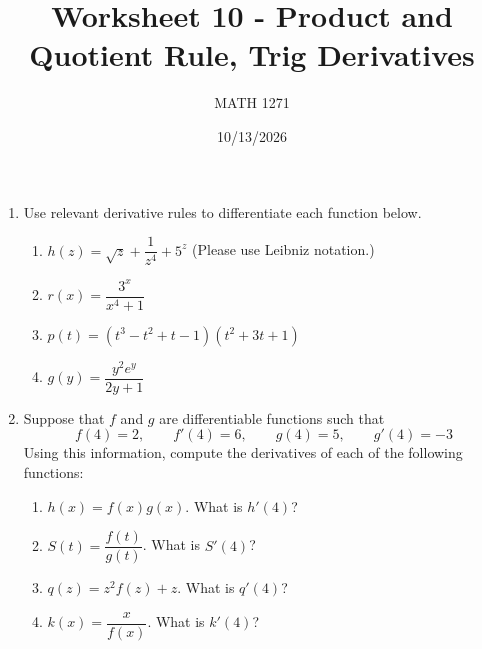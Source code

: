 \documentclass[12pt]{exam}
\title{Worksheet 10 - Product and Quotient Rule, Trig Derivatives}
\author{MATH 1271}
\date{10/13/2026}
\begin{document}
\newpage
\maketitle

\begin{enumerate}

\item Use relevant derivative rules to differentiate each function below.

\begin{enumerate}

\item $h(z)=\sqrt{z}+\dfrac{1}{z^4}+5^z$ (Please use Leibniz notation.)

\vfill

\item $r(x)=\dfrac{3^x}{x^4+1}$

\vfill

\item $p(t)=(t^3-t^2+t-1)(t^2+3t+1)$

\vfill

\item $g(y)=\dfrac{y^2e^y}{2y+1}$

\vfill

\end{enumerate}

\newpage



\item Suppose that $f$ and $g$ are differentiable functions such that
$$f(4)=2, \qquad f'(4)=6, \qquad g(4)=5, \qquad g'(4)=-3$$
Using this information, compute the derivatives of each of the following functions:

\begin{enumerate}

\item $h(x)=f(x)g(x)$. What is $h'(4)$?

\vfill

\item $S(t)=\dfrac{f(t)}{g(t)}$. What is $S'(4)$?

\vfill



\item $q(z)=z^2f(z)+z$. What is $q'(4)$?

\vfill

\item $k(x)=\dfrac{x}{f(x)}$. What is $k'(4)$?


\end{enumerate}
\end{enumerate}
\end{document}

